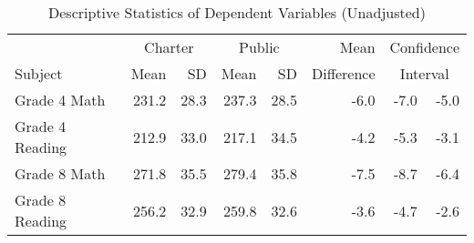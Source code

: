 \begin{table}[ht]
\centering
\caption{Descriptive Statistics of Dependent Variables (Unadjusted)} 
\label{dependentDescriptives}
\begin{tabular}{lrr@{\extracolsep{.2cm}}rrrrr}
  \hline
   & \multicolumn{2}{c}{Charter} & \multicolumn{2}{c}{Public} & Mean & \multicolumn{2}{c}{Confidence} \\ \cline{2-3} \cline{4-5}  Subject & Mean & SD & Mean & SD & Difference & \multicolumn{2}{c}{Interval} \\  \hline
Grade 4 Math & 231.2 & 28.3 & 237.3 & 28.5 & -6.0 & -7.0 & -5.0 \\ 
  Grade 4 Reading & 212.9 & 33.0 & 217.1 & 34.5 & -4.2 & -5.3 & -3.1 \\ 
  Grade 8 Math & 271.8 & 35.5 & 279.4 & 35.8 & -7.5 & -8.7 & -6.4 \\ 
  Grade 8 Reading & 256.2 & 32.9 & 259.8 & 32.6 & -3.6 & -4.7 & -2.6 \\ 
   \hline
\end{tabular}
\end{table}
